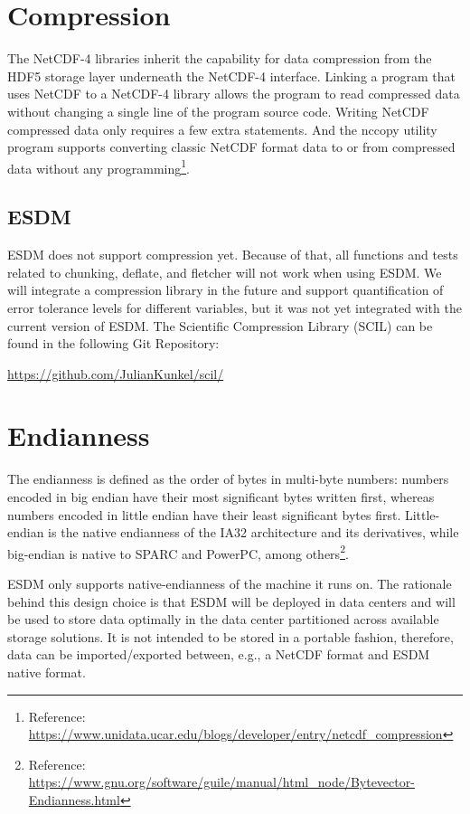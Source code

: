\section{Compression}

The NetCDF-4 libraries inherit the capability for data compression from the HDF5 storage layer underneath the NetCDF-4 interface. Linking a program that uses NetCDF to a NetCDF-4 library allows the program to read compressed data without changing a single line of the program source code. Writing NetCDF compressed data only requires a few extra statements. And the nccopy utility program supports converting classic NetCDF format data to or from compressed data without any programming\footnote{Reference: \url{https://www.unidata.ucar.edu/blogs/developer/entry/netcdf_compression}}.

\subsection{ESDM}


ESDM does not support compression yet.
Because of that, all functions and tests related to chunking, deflate, and fletcher will not work when using ESDM.
We will integrate a compression library in the future and support quantification of error tolerance levels for different variables, but it was not yet integrated with the current version of ESDM. The Scientific Compression Library (SCIL) can be found in the following Git Repository:

\begin{center}
\url{https://github.com/JulianKunkel/scil/}
\end{center}

\section{Endianness}


The endianness is defined as the order of bytes in multi-byte numbers: numbers encoded in big endian have their most significant bytes written first, whereas numbers encoded in little endian have their least significant bytes first. Little-endian is the native endianness of the IA32 architecture and its derivatives, while big-endian is native to SPARC and PowerPC, among others\footnote{Reference: \url{https://www.gnu.org/software/guile/manual/html_node/Bytevector-Endianness.html}}.

ESDM only supports native-endianness of the machine it runs on.
The rationale behind this design choice is that ESDM will be deployed in data centers and will be used to store data optimally in the data center partitioned across available storage solutions.
It is not intended to be stored in a portable fashion, therefore, data can be imported/exported between, e.g., a NetCDF format and ESDM native format.

